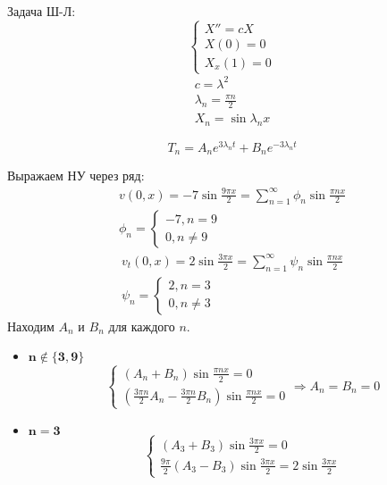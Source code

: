 \documentclass[11pt]{article}
\newenvironment{me}{
  \begin{equation}
    \begin{gathered}
      }{
    \end{gathered}
  \end{equation}
}
\newenvironment{ce}{
  \begin{equation}
    \begin{cases}
      }{
    \end{cases}
  \end{equation}
}
\begin{document}
\begin{sloppypar}
  Задача Ш-Л:
  \begin{ce}
    X'' = cX \\
    X(0) = 0 \\
    X_x(1) = 0
  \end{ce}
  \begin{me}
    c = \lambda^2 \\
    \lambda_n = \frac{\pi n}{2} \\
    X_n = \sin{\lambda_n x}
  \end{me}
  
  \begin{equation}
    T_n = A_ne^{3\lambda_n t} + B_ne^{- 3\lambda_n t}
  \end{equation}

  Выражаем НУ через ряд:
  \begin{me}
    v(0, x) = -7\sin{\frac{9\pi x}{2}} = \sum_{n = 1}^\infty \phi_n \sin{\frac{\pi n x}{2}} \\
    \phi_n = \begin{cases}
      -7, n = 9 \\
      0, n \neq 9
    \end{cases}
  \end{me}
  \begin{me}
    v_t(0, x) = 2\sin{\frac{3\pi x}{2}} = \sum_{n = 1}^\infty \psi_n \sin{\frac{\pi n x}{2}} \\
    \psi_n = \begin{cases}
      2, n = 3 \\
      0, n \neq 3
    \end{cases}
  \end{me}
  Находим $A_n$ и $B_n$ для каждого $n$.
  \begin{itemize}
    \item $\mathbf{n \notin \{3, 9\}}$
    \begin{equation}
      \begin{cases}
        (A_n + B_n)\sin{\frac{\pi n x}{2}} = 0 \\
        (\frac{3\pi n}{2}A_n - \frac{3\pi n}{2}B_n)\sin{\frac{\pi n x}{2}} = 0
      \end{cases}
      \Rightarrow A_n = B_n = 0  
    \end{equation}
    \item $\mathbf{n = 3}$
    \begin{equation}
      \begin{cases}
        (A_3 + B_3)\sin{\frac{3\pi x}{2}} = 0 \\
        \frac{9\pi}{2}(A_3 - B_3)\sin{\frac{3\pi x}{2}} = 2\sin{\frac{3\pi x}{2}}     

\end{cases}
\end{equation}
\end{itemize}
\end{sloppypar}
\end{document}
